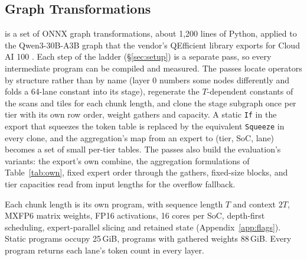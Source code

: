 \subsection{Graph Transformations}
\label{sec:impl-graph}

\sys is a set of ONNX graph transformations, about 1,200 lines of Python, applied to the Qwen3-30B-A3B graph that the
vendor's QEfficient library exports for Cloud AI 100 \citep{qefficient}. Each step of the ladder (\S\ref{sec:setup}) is a
separate pass, so every intermediate program can be compiled and measured. The passes locate operators by structure rather than
by name (layer 0 numbers some nodes differently and folds a 64-lane constant into its stage), regenerate the
$T$-dependent constants of the scans and tiles for each chunk length, and clone the stage subgraph once per tier with its
own row order, weight gathers and capacity. A static \texttt{If} in the export that squeezes the token table is replaced
by the equivalent \texttt{Squeeze} in every clone, and the aggregation's map from an expert to (tier, SoC, lane) becomes a set of
small per-tier tables. The passes also build the evaluation's variants: the export's own combine, the aggregation formulations of
Table~\ref{tab:own}, fixed expert order
through the gathers, fixed-size blocks, and tier capacities read from input lengths for the overflow fallback.

Each chunk length is its own program, with sequence length $T$ and context $2T$, MXFP6 matrix weights, FP16
activations, 16 cores per SoC, depth-first scheduling, expert-parallel slicing and retained state
(Appendix~\ref{app:flags}). Static programs occupy 25\,GiB, programs with gathered weights 88\,GiB. Every program returns each lane's token count in every layer.
